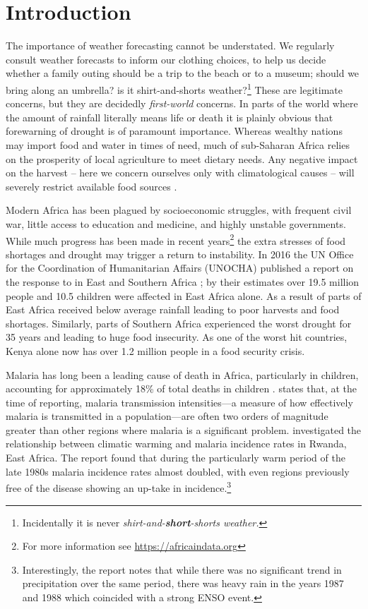 \section{Introduction}

The importance of weather forecasting cannot be understated. We regularly
consult weather forecasts to inform our clothing choices, to help us decide
whether a family outing should be a trip to the beach or to a museum; should we
bring along an umbrella? is it shirt-and-shorts weather?\footnote{Incidentally
  it is never \emph{shirt-and-\textbf{short}-shorts weather.}} These are
legitimate concerns, but they are decidedly \emph{first-world} concerns. In
parts of the world where the amount of rainfall literally means life or death it
is plainly obvious that forewarning of drought is of paramount importance.
Whereas wealthy nations may import food and water in times of need, much of
sub-Saharan Africa relies on the prosperity of local agriculture to meet dietary
needs. Any negative impact on the harvest -- here we concern ourselves only with
climatological causes -- will severely restrict available food sources
\citep{development2006mapping}.

Modern Africa has been plagued by socioeconomic struggles, with frequent civil
war, little access to education and medicine, and highly unstable
governments. While much progress has been made in recent years\footnote{For more
  information see \url{https://africaindata.org}} the extra stresses of food
shortages and drought may trigger a return to instability.
In 2016 the UN Office for the Coordination of Humanitarian Affairs (UNOCHA)
published a report on the response to \elnino{} in East and Southern Africa
\citep{unocha2016}; by their estimates over 19.5 million people and 10.5
children were affected in East Africa alone. As a result of \elnino{} parts of
East Africa received below average rainfall leading to poor harvests and food
shortages. Similarly, parts of Southern Africa experienced the worst drought for
35 years and leading to huge food insecurity. As one of the worst hit countries,
Kenya alone now has over 1.2 million people in a food security crisis.

Malaria has long been a leading cause of death in Africa, particularly in
children, accounting for approximately 18\% of total deaths in children
\citep{IMHE2016}. \citet{Alles1998} states that, at the time of reporting,
malaria transmission intensities---a measure of how effectively malaria is
transmitted in a population---are often two orders of magnitude greater than other
regions where malaria is a significant problem. \citet{loevinsohn1994}
investigated the relationship between climatic warming and malaria incidence
rates in Rwanda, East Africa. The report found that during the particularly warm
period of the late 1980s malaria incidence rates almost doubled, with even
regions previously free of the disease showing an up-take in
incidence.\footnote{Interestingly, the report notes that while there was no
  significant trend in precipitation over the same period, there was heavy rain
  in the years 1987 and 1988 which coincided with a strong ENSO event.}

